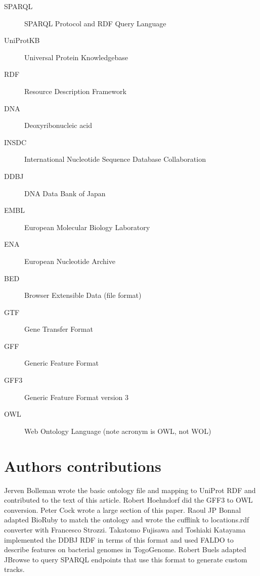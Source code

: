 \documentclass[10pt]{bmc_article}
\newenvironment{bmcformat}{\begin{raggedright}\baselineskip20pt\sloppy\setboolean{publ}{false}}{\end{raggedright}\baselineskip20pt\sloppy}
\begin{document}
\begin{bmcformat}
\begin{description}
\item[SPARQL] SPARQL Protocol and RDF Query Language
\item[UniProtKB] Universal Protein Knowledgebase 
\item[RDF] Resource Description Framework
\item[DNA] Deoxyribonucleic acid
\item[INSDC] International Nucleotide Sequence Database Collaboration
\item[DDBJ] DNA Data Bank of Japan
\item[EMBL] European Molecular Biology Laboratory
\item[ENA] European Nucleotide Archive
\item[BED] Browser Extensible Data (file format)
\item[GTF] Gene Transfer Format
\item[GFF] Generic Feature Format
\item[GFF3] Generic Feature Format version 3
\item[OWL] Web Ontology Language (note acronym is OWL, not WOL)
\end{description}
\bigskip

\section*{Authors contributions}

Jerven Bolleman wrote the basic ontology file and mapping to UniProt RDF and contributed to the text of this article.
Robert Hoehndorf did the GFF3 to OWL conversion.
Peter Cock wrote a large section of this paper.
Raoul JP Bonnal adapted BioRuby to match the ontology and wrote the cufflink to locations.rdf converter with Francesco Strozzi.
Takatomo Fujisawa and Toshiaki Katayama implemented the DDBJ RDF in terms of this format and used FALDO to describe features on bacterial genomes in TogoGenome.
Robert Buels adapted JBrowse to query SPARQL endpoints that use this format to generate custom tracks. 


\end{bmcformat}
\end{document}
